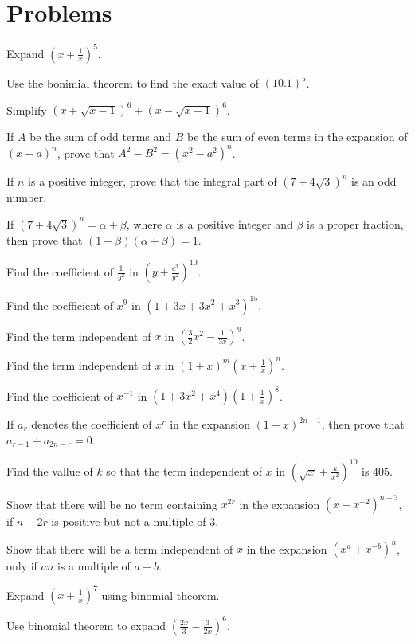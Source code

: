 \section{Problems}

\startitemize[n, 1*broad]
\item Expand $\left(x + \frac{1}{x}\right)^5$.
\item Use the bonimial theorem to find the exact value of $(10.1)^5$.
\item Simplify $(x + \sqrt{x - 1})^6 + (x - \sqrt{x - 1})^6$.
\item If $A$ be the sum of odd terms and $B$ be the sum of even terms in the expansion of $(x + a)^n$, prove that $A^2 - B^2 = (x^2
  - a^2)^n$.
\item If $n$ is a positive integer, prove that the integral part of $(7 + 4\sqrt{3})^n$ is an odd number.
\item If $(7 + 4\sqrt{3})^n = \alpha + \beta$, where $\alpha$ is a positive integer and $\beta$ is a proper fraction, then prove
  that $(1 - \beta)(\alpha + \beta) = 1$.
\item Find the coefficient of $\frac{1}{y^2}$ in $\left(y + \frac{c^3}{y^2}\right)^{10}$.
\item Find the coefficient of $x^9$ in $(1 + 3x + 3x^2 + x^3)^{15}$.
\item Find the term independent of $x$ in $\left(\frac{3}{2}x^2 - \frac{1}{3x}\right)^9$.
\item Find the term independent of $x$ in $(1 + x)^m\left(x + \frac{1}{x}\right)^n$.
\item Find the coefficient of $x^{-1}$ in $(1 + 3x^2 + x^4)\left(1 + \frac{1}{x}\right)^8$.
\item If $a_r$ denotes the coefficient of $x^r$ in the expansion $(1 - x)^{2n - 1}$, then prove that $a_{r - 1} + a_{2n - r} = 0$.
\item Find the vallue of $k$ so that the term independent of $x$ in $\left(\sqrt{x} + \frac{k}{x^2}\right)^{10}$ is $405$.
\item Show that there will be no term containing $x^{2r}$ in the expansion $(x + x^{-2})^{n - 3}$, if $n - 2r$ is positive but not
  a multiple of $3$.
\item Show that there will be a term independent of $x$ in the expansion $(x^a + x^{-b})^n$, only if $an$ is a multiple of $a + b$.
\item Expand $\left(x + \frac{1}{x}\right)^7$ using binomial theorem.
\item Use binomial theorem to expand $\left(\frac{2x}{3} - \frac{3}{2x}\right)^6$.
